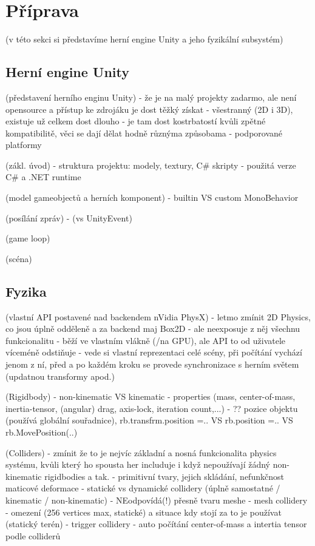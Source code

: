 \chapter{Příprava}
(v této sekci si představíme herní engine Unity a jeho fyzikální subsystém)

\section{Herní engine Unity}

(představení herního enginu Unity)
- že je na malý projekty zadarmo, ale není opensource a přístup ke zdrojáku je dost těžký získat
- všestranný (2D i 3D), existuje už celkem dost dlouho - je tam dost kostrbatostí kvůli zpětné kompatibilitě, věci se dají dělat hodně různýma způsobama
- podporované platformy

(zákl. úvod)
- struktura projektu: modely, textury, C\# skripty
- použitá verze C\# a .NET runtime

(model gameobjectů a herních komponent)
- builtin VS custom MonoBehavior

(posílání zpráv)
- (vs UnityEvent)

(game loop)

(scéna)



\section{Fyzika}

(vlastní API postavené nad backendem nVidia PhysX)
- letmo zmínit 2D Physics, co jsou úplně odděleně a za backend maj Box2D 
- ale neexposuje z něj všechnu funkcionalitu
- běží ve vlastním vlákně (/na GPU), ale API to od uživatele víceméně odstiňuje
- vede si vlastní reprezentaci celé scény, při počítání vychází jenom z ní, před a po každém kroku se provede synchronizace s herním světem (updatnou transformy apod.)

(Rigidbody)
- non-kinematic VS kinematic
- properties (mass, center-of-mass, inertia-tensor, (angular) drag, axis-lock, iteration count,...)
- ?? pozice objektu (používá globální souřadnice), rb.transfrm.position =.. VS rb.position =.. VS rb.MovePosition(..)

(Colliders)
- zmínit že to je nejvíc základní a nosná funkcionalita physics systému, kvůli který ho spousta her includuje i když nepoužívají žádný non-kinematic rigidbodies a tak.  
- primitivní tvary, jejich skládání, nefunkčnost maticové deformace
- statické vs dynamické collidery (úplně samostatné / kinematic / non-kinematic)
- NEodpovídá(!) přesně tvaru meshe
- mesh collidery - omezení (256 vertices max, statické) a situace kdy stojí za to je používat (statický terén)
- trigger collidery
- auto počítání center-of-mass a intertia tensor podle colliderů

